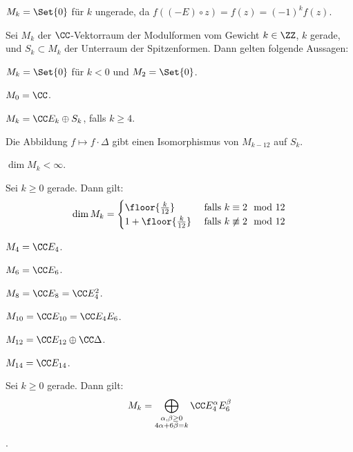 \begin{beme}
$M_k = \Set {0}$ für $k$ ungerade, da $f((-E) \circ z) = f(z) = (-1)^k f(z)$.
\end{beme}

Sei $M_k$ der $\CC$-Vektorraum der Modulformen vom Gewicht $k \in \ZZ$, $k$ gerade, und $S_k \subset M_k$ der Unterraum der Spitzenformen. Dann gelten folgende Aussagen:

\begin{satz-list}\label{M_k1}
\item $M_k = \Set {0}$ für $k < 0$ und $M_2 = \Set {0}$.
\item $M_0 = \CC$.
\item $M_k = \CC E_k \oplus S_k$, falls $k \geq 4$.
\item Die Abbildung $f \mapsto f \cdot \Delta$ gibt einen Isomorphismus von $M_{k-12}$ auf $S_k$.
\item $\dim M_k < \infty$.
\end{satz-list}

\begin{satz}
Sei $k \geq 0$ gerade. Dann gilt:
\[
\dim M_k = \begin{cases}
\floor{\frac k{12}} & \text{ falls } k \equiv 2 \mod 12\\
1 + \floor{\frac k{12}} & \text{ falls } k \not \equiv 2 \mod 12
\end{cases}
\]
\end{satz}

\begin{bsp-list}\label{M_k2}
\item $M_4 = \CC E_4$.
\item $M_6 = \CC E_6$.
\item $M_8 = \CC E_8 = \CC E_4^2$.
\item $M_{10} = \CC E_{10} = \CC E_4 E_6$.
\item $M_{12} = \CC E_{12} \oplus \CC \Delta$.
\item $M_{14} = \CC E_{14}$.
\end{bsp-list}


\begin{satz}
Sei $k \geq 0$ gerade. Dann gilt:
\[
M_k = \bigoplus_{\substack{\alpha, \beta \geq 0\\ 4\alpha + 6\beta = k}} \CC E_4^\alpha E_6^\beta
\].
\end{satz}

